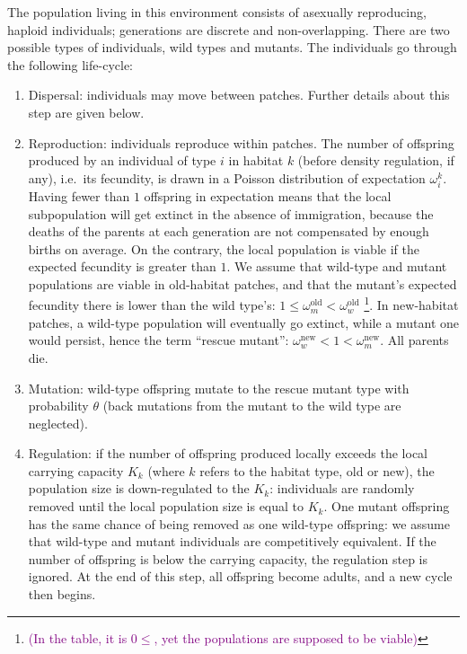 \documentclass[a4paper,11pt]{article}
\newcommand{\florence}[1]{\textcolor{purple}{(#1)}} %
\begin{document}
The population living in this environment consists of asexually reproducing, haploid individuals; generations are discrete and non-overlapping. There are two possible types of individuals, wild types and mutants. The individuals go through the following life-cycle: \begin{enumerate}[label = (\roman*)]
	\item Dispersal: individuals may move between patches. Further details about this step are given below.
	\item Reproduction: individuals reproduce within patches. The number of offspring produced by an individual of type $i$ in habitat $k$ (before density regulation, if any), i.e.\ its fecundity, is drawn in a Poisson distribution of expectation $\omega_i^k$. Having fewer than $1$ offspring in expectation means that the local subpopulation will get extinct in the absence of immigration, because the deaths of the parents at each generation are not compensated by enough births on average. On the contrary, the local population is viable if the expected fecundity is greater than $1$. We assume that wild-type and mutant populations are viable in old-habitat patches, and that the mutant's expected fecundity there is lower than the wild type's: $1 \leq \omega^{\text{old}}_m < \omega^{\text{old}}_w$ \footnote{\florence{In the table, it is $0 \leq $, yet the populations are supposed to be viable}}. In new-habitat patches, a wild-type population will eventually go extinct, while a mutant one would persist, hence the term ``rescue mutant'': $\omega^{\text{new}}_w < 1 < \omega^{\text{new}}_m$. All parents die.
	\item Mutation: wild-type offspring mutate to the rescue mutant type with probability $\theta$ (back mutations from the mutant to the wild type are neglected).
	\item Regulation: if the number of offspring produced locally exceeds the local carrying capacity $K_k$ (where $k$ refers to the habitat type, old or new), the population size is down-regulated to the $K_k$: individuals are randomly removed until the local population size is equal to $K_k$. One mutant offspring has the same chance of being removed as one wild-type offspring:  we assume that wild-type and mutant individuals are competitively equivalent. If the number of offspring is below the carrying capacity, the regulation step is ignored. 
	At the end of this step, all offspring become adults, and a new cycle then begins.
\end{enumerate}
\end{document}
